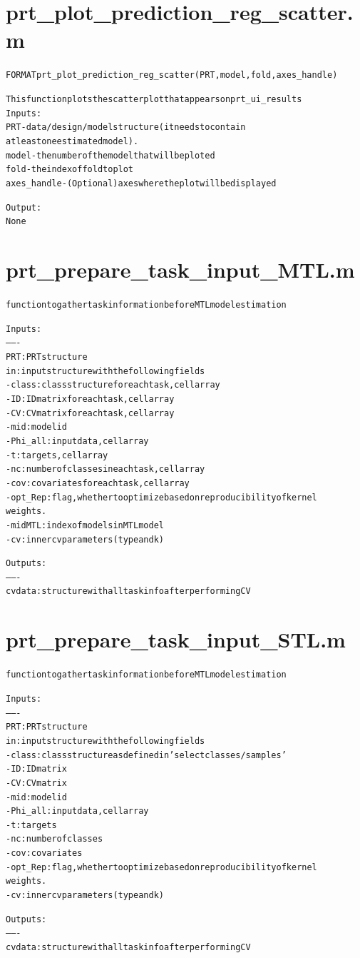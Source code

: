 \section{prt\_plot\_prediction\_reg\_scatter.m}
\begin{alltt}

 FORMAT prt\_plot\_prediction\_reg\_scatter(PRT, model, fold,axes\_handle)
 
 This function plots the scatter plot that appears on prt\_ui\_results
 Inputs:
       PRT             - data/design/model structure (it needs to contain
                         at least one estimated model).
       model           - the number of the model that will be ploted
       fold            - the index of fold to plot
       axes\_handle     - (Optional) axes where the plot will be displayed
 
 Output:
       None
\end{alltt}


\section{prt\_prepare\_task\_input\_MTL.m}
\begin{alltt}

 function to gather task information before MTL model estimation
 
 Inputs:
 -------
 PRT: PRT structure
 in: input structure with the following fields
   - class: class structure for each task, cell array
   - ID: ID matrix for each task, cell array
   - CV: CV matrix for each task, cell array
   - mid: model id
   - Phi\_all: input data, cell array
   - t: targets, cell array
   - nc: number of classes in each task, cell array
   - cov: covariates for each task, cell array
   - opt\_Rep: flag, whether to optimize based on reproducibility of kernel
   weights.
   - midMTL: index of models in MTL model
   - cv: inner cv parameters (type and k)
 
 Outputs:
 -------
 cvdata: structure with all task info after performing CV
\end{alltt}


\section{prt\_prepare\_task\_input\_STL.m}
\begin{alltt}

 function to gather task information before MTL model estimation
 
 Inputs:
 -------
 PRT: PRT structure
 in: input structure with the following fields
   - class: class structure as defined in 'select classes/samples'
   - ID: ID matrix 
   - CV: CV matrix 
   - mid: model id
   - Phi\_all: input data, cell array
   - t: targets
   - nc: number of classes 
   - cov: covariates 
   - opt\_Rep: flag, whether to optimize based on reproducibility of kernel
   weights.
   - cv: inner cv parameters (type and k)
 
 Outputs:
 -------
 cvdata: structure with all task info after performing CV
\end{alltt}


